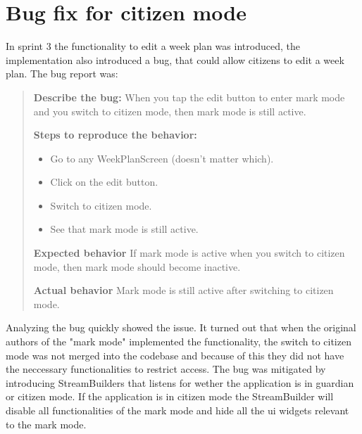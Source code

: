 \section{Bug fix for citizen mode}
In sprint 3 the functionality to edit a week plan was introduced, the implementation also introduced a bug, that could allow citizens to edit a week plan. The bug report was:

\begin{quote}
  \textbf{Describe the bug:} When you tap the edit button to enter mark mode and you switch to citizen mode, then mark mode is still active.

  \textbf{Steps to reproduce the behavior:}
  \begin{itemize}
    \item Go to any WeekPlanScreen (doesn't matter which).
    \item Click on the edit button.
    \item Switch to citizen mode.
    \item See that mark mode is still active.
  \end{itemize}

  \textbf{Expected behavior}
  If mark mode is active when you switch to citizen mode, then mark mode should become inactive.

  \textbf{Actual behavior}
  Mark mode is still active after switching to citizen mode.
\end{quote}

Analyzing the bug quickly showed the issue. It turned out that when the original authors of the "mark mode" implemented the functionality, the switch to citizen mode was not merged into the codebase and because of this they did not have the neccessary functionalities to restrict access. The bug was mitigated by introducing StreamBuilders that listens for wether the application is in guardian or citizen mode. If the application is in citizen mode the StreamBuilder will disable all functionalities of the mark mode and hide all the \gls{ui} widgets relevant to the mark mode.